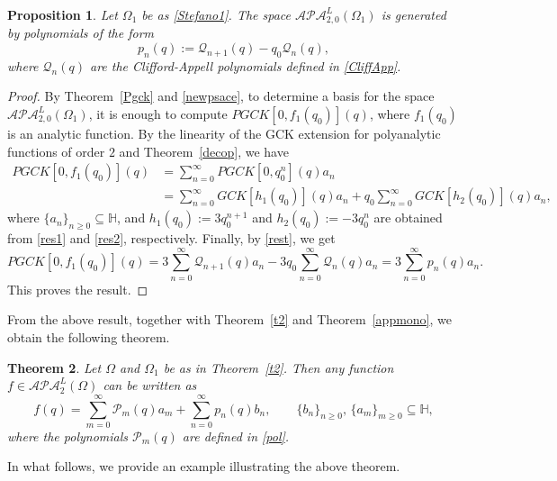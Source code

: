 \documentclass[reqno,11pt]{amsart}
\numberwithin{equation}{section}
\newtheorem{theorem}{Theorem}[section]
\newtheorem{proposition}[theorem]{Proposition}
\theoremstyle{definition}
\begin{document}
\begin{proposition}
\label{zerobasis}
Let $\Omega_1$ be as \eqref{Stefano1}. The space $\mathcal{APA}^L_{2,0}(\Omega_1)$ is generated by polynomials of the form
\begin{equation}
\label{bh}
p_n(q):= \mathcal{Q}_{n+1}(q)-q_0 \mathcal{Q}_n(q),
\end{equation}
where $ \mathcal{Q}_n(q)$ are the Clifford-Appell polynomials defined in \eqref{CliffApp}.
\end{proposition}
\begin{proof}
By Theorem~\ref{Pgck} and \eqref{newpsace}, to determine a basis for the space $\mathcal{APA}^L_{2,0}(\Omega_1)$, it is enough to compute $PGCK[0, f_1(q_0)](q)$, where $f_1(q_0)$ is an analytic function. By the linearity of the GCK extension for polyanalytic functions of order $2$ and Theorem~\ref{decop}, we have
\begin{align*}
	PGCK[0, f_1(q_0)](q)
	&= \sum_{n=0}^\infty PGCK[0, q_0^n](q) a_n \\
	&= \sum_{n=0}^\infty GCK[h_1(q_0)](q) a_n + q_0 \sum_{n=0}^{\infty} GCK[h_2(q_0)](q) a_n,
\end{align*}
where $\{a_n\}_{n \geq 0} \subseteq \mathbb{H}$, and $h_1(q_0) := 3 q_0^{n+1}$ and $h_2(q_0) := -3 q_0^n$ are obtained from \eqref{res1} and \eqref{res2}, respectively. Finally, by \eqref{rest}, we get
$$	PGCK[0, f_1(q_0)](q) =3 \sum_{n=0}^{\infty} \mathcal{Q}_{n+1}(q)a_n-3 q_0 \sum_{n=0}^\infty \mathcal{Q}_n(q)a_n= 3 \sum_{n=0}^{\infty} p_n(q)a_n.$$
This proves the result.
\end{proof}

From the above result, together with Theorem~\ref{t2} and Theorem~\ref{appmono}, we obtain the following theorem.

\begin{theorem}
	Let $\Omega$ and $\Omega_1$ be as in Theorem~\ref{t2}. Then any function $f \in \mathcal{APA}_2^L(\Omega)$ can be written as
	$$
	f(q)= \sum_{m=0}^\infty \mathcal{P}_m(q)a_m+\sum_{n=0}^{\infty} p_n(q) b_n, \qquad  \{b_n\}_{n \geq 0}, \, \{a_m\}_{m \geq 0} \subseteq \mathbb{H},
	$$
where the polynomials $\mathcal{P}_m(q)$ are defined in \eqref{pol}.
\end{theorem}

In what follows, we provide an example illustrating the above theorem.
\end{document}
